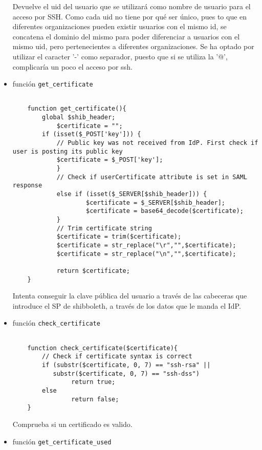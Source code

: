 \begin{itemize}
    Devuelve el uid del usuario que se utilizará como nombre de usuario
    para el acceso por SSH. Como cada uid no tiene por qué ser único, pues
    to que en diferentes organizaciones pueden existir usuarios con el
    mismo id, se concatena el dominio del mismo para poder diferenciar a
    usuarios con el mismo uid, pero pertenecientes a diferentes
    organizaciones. Se ha optado por utilizar el caracter '-' como
    separador, puesto que si se utiliza la '@', complicaría un poco el
    acceso por ssh.

    \item función \texttt{get\_certificate}
    \begin{lstlisting}
    
    function get_certificate(){
        global $shib_header;
            $certificate = "";
        if (isset($_POST['key'])) {
            // Public key was not received from IdP. First check if user is posting its public key
            $certificate = $_POST['key'];
            }
            // Check if userCertificate attribute is set in SAML response
            else if (isset($_SERVER[$shib_header])) {
                    $certificate = $_SERVER[$shib_header];
                    $certificate = base64_decode($certificate);
            }
            // Trim certificate string
            $certificate = trim($certificate);
            $certificate = str_replace("\r","",$certificate);
            $certificate = str_replace("\n","",$certificate);

            return $certificate;
    }
    \end{lstlisting}

    Intenta conseguir la clave pública del usuario a través de las
    cabeceras que introduce el SP de shibboleth, a través de los datos que
    le manda el IdP.

    \item función \texttt{check\_certificate}
    \begin{lstlisting}

    function check_certificate($certificate){
        // Check if certificate syntax is correct
        if (substr($certificate, 0, 7) == "ssh-rsa" ||
           substr($certificate, 0, 7) == "ssh-dss")
                return true;
        else
                return false;
    }
    \end{lstlisting}

    Comprueba si un certificado es valido.

    \item función \texttt{get\_certificate\_used}
    \begin{lstlisting}


\end{lstlisting}
\end{itemize}
